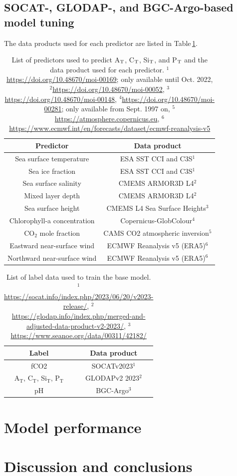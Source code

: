 \documentclass{article}
\begin{document}
	\subsection{SOCAT-, GLODAP-, and BGC-Argo-based model tuning}
	The data products used for each predictor are listed in Table\,\ref{tab:pred_data}.
	\begin{table}
		\centering
		\bgroup
		\def\arraystretch{1.5}
		\begin{tabular}{c|c}
			Predictor & Data product \\ \hline
			Sea surface temperature & ESA SST CCI and C3S$^1$  \\
			Sea ice fraction & ESA SST CCI and C3S$^1$  \\
			Sea surface salinity & CMEMS ARMOR3D L4$^2$ \\
			Mixed layer depth & CMEMS ARMOR3D L4$^2$ \\
			Sea surface height & CMEMS L4 Sea Surface Heights$^3$ \\
			Chlorophyll-a concentration & Copernicus-GlobColour$^4$ \\
			CO$_2$ mole fraction & CAMS CO2 atmospheric inversion$^5$ \\
			Eastward near-surface wind & ECMWF Reanalysis v5 (ERA5)$^6$ \\
			Northward near-surface wind & ECMWF Reanalysis v5 (ERA5)$^6$
		\end{tabular}
		\egroup
		\caption{List of predictors used to predict A$_\textup{T}$, C$_\textup{T}$, Si$_\textup{T}$, and P$_\textup{T}$ and the data product used for each predictor. $^1$\url{https://doi.org/10.48670/moi-00169}; only available until Oct. 2022, $^2$\url{https://doi.org/10.48670/moi-00052}, $^3$\url{https://doi.org/10.48670/moi-00148},
		$^4$\url{https://doi.org/10.48670/moi-00281}; only available from Sept. 1997 on, $^5$\url{https://atmosphere.copernicus.eu}, $^6$\url{https://www.ecmwf.int/en/forecasts/dataset/ecmwf-reanalysis-v5}}
		\label{tab:pred_data}
	\end{table}
	
	\begin{table}
		\centering
		\bgroup
		\def\arraystretch{1.5}
		\begin{tabular}{c|c}
			Label & Data product \\ \hline
			fCO2 & SOCATv2023$^1$ \\
			A$_\text{T}$, C$_\text{T}$, Si$_\text{T}$, P$_\text{T}$ & GLODAPv2 2023$^2$ \\
			pH & BGC-Argo$^3$
		\end{tabular}
		\egroup
		\caption{List of label data used to train the base model. $^1$\url{https://socat.info/index.php/2023/06/20/v2023-release/}, $^2$\url{https://glodap.info/index.php/merged-and-adjusted-data-product-v2-2023/}, $^3$\url{https://www.seanoe.org/data/00311/42182/}}
		\label{tab:label_data}
	\end{table}
	\section{Model performance}
	\section{Discussion and conclusions}
	\medskip
	
	
	
\end{document}
